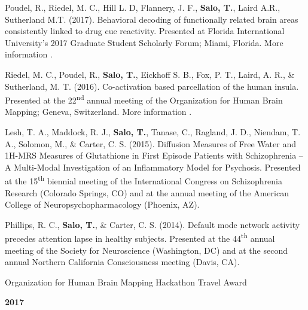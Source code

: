 \documentclass[10pt]{article}
\newcommand{\sectionstyle}{\LARGE \fontfamily{lmr}\selectfont}
\newcommand{\textlink}[3][blue]{\href{#2}{\color{#1}{#3}}}
\begin{document}
\begin{hangparas}{.25in}{1}
	\bigskip

	Poudel, R.,  Riedel, M. C., Hill L. D, Flannery, J. F., \textbf{Salo, T.},
	Laird A.R., Sutherland M.T. (2017). Behavioral decoding of functionally related
	brain areas consistently linked to drug cue reactivity. Presented at Florida
	International University's 2017 Graduate Student Scholarly Forum; Miami, Florida.
	More information
	\textlink{https://nbclab.github.io/posters/poudel-cue-reactivity-poster}{here}.

	\bigskip

	Riedel, M. C., Poudel, R., \textbf{Salo, T.}, Eickhoff S. B., Fox, P. T.,
	Laird, A. R., \& Sutherland, M. T. (2016). Co-activation based parcellation of
	the human insula. Presented at the 22\textsuperscript{nd} annual meeting of the
	Organization for Human Brain Mapping; Geneva, Switzerland. More information
	\textlink{https://osf.io/pqvqy}{here}.

	\bigskip

	Lesh, T. A., Maddock, R. J., \textbf{Salo, T.}, Tanase, C., Ragland, J. D.,
	Niendam, T. A., Solomon, M., \& Carter, C. S. (2015). Diffusion Measures of
	Free Water and 1H-MRS Measures of Glutathione in First Episode Patients with
	Schizophrenia -- A Multi-Modal Investigation of an Inflammatory Model for
	Psychosis. Presented at the 15\textsuperscript{th} biennial meeting of the
	International Congress on Schizophrenia Research (Colorado Springs, CO) and at
	the annual meeting of the American College of Neuropsychopharmacology (Phoenix,
	AZ).

	\bigskip

	Phillips, R. C., \textbf{Salo, T.}, \& Carter, C. S. (2014). Default mode
	network activity precedes attention lapse in healthy subjects. Presented at
	the 44\textsuperscript{th} annual meeting of the Society for Neuroscience
	(Washington, DC) and at the second annual Northern California Consciousness
	meeting (Davis, CA).

\end{hangparas}

\bigskip

\begin{center}\sectionstyle{HONORS AND AWARDS}\end{center}

\begin{minipage}[t]{.85\linewidth}
\flushleft
\noindent
Organization for Human Brain Mapping Hackathon Travel Award
\end{minipage}
\hfill
\begin{minipage}[t]{.15\linewidth}
\flushright
\noindent
\textsc{\textbf{2017}}
\end{minipage}
\end{document}
